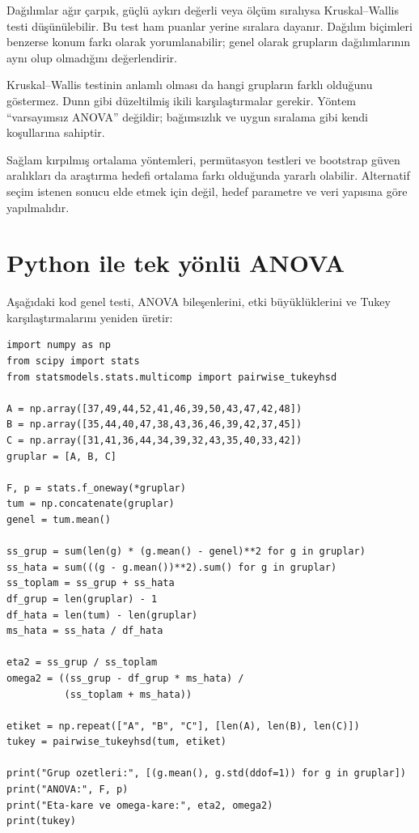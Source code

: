 Dağılımlar ağır çarpık, güçlü aykırı değerli veya ölçüm sıralıysa
Kruskal--Wallis testi düşünülebilir. Bu test ham puanlar yerine sıralara
dayanır. Dağılım biçimleri benzerse konum farkı olarak yorumlanabilir; genel
olarak grupların dağılımlarının aynı olup olmadığını değerlendirir.

Kruskal--Wallis testinin anlamlı olması da hangi grupların farklı olduğunu
göstermez. Dunn gibi düzeltilmiş ikili karşılaştırmalar gerekir. Yöntem
``varsayımsız ANOVA'' değildir; bağımsızlık ve uygun sıralama gibi kendi
koşullarına sahiptir.

Sağlam kırpılmış ortalama yöntemleri, permütasyon testleri ve bootstrap güven
aralıkları da araştırma hedefi ortalama farkı olduğunda yararlı olabilir.
Alternatif seçim istenen sonucu elde etmek için değil, hedef parametre ve veri
yapısına göre yapılmalıdır.

\section{Python ile tek yönlü ANOVA}

Aşağıdaki kod genel testi, ANOVA bileşenlerini, etki büyüklüklerini ve Tukey
karşılaştırmalarını yeniden üretir:

\begin{lstlisting}
import numpy as np
from scipy import stats
from statsmodels.stats.multicomp import pairwise_tukeyhsd

A = np.array([37,49,44,52,41,46,39,50,43,47,42,48])
B = np.array([35,44,40,47,38,43,36,46,39,42,37,45])
C = np.array([31,41,36,44,34,39,32,43,35,40,33,42])
gruplar = [A, B, C]

F, p = stats.f_oneway(*gruplar)
tum = np.concatenate(gruplar)
genel = tum.mean()

ss_grup = sum(len(g) * (g.mean() - genel)**2 for g in gruplar)
ss_hata = sum(((g - g.mean())**2).sum() for g in gruplar)
ss_toplam = ss_grup + ss_hata
df_grup = len(gruplar) - 1
df_hata = len(tum) - len(gruplar)
ms_hata = ss_hata / df_hata

eta2 = ss_grup / ss_toplam
omega2 = ((ss_grup - df_grup * ms_hata) /
          (ss_toplam + ms_hata))

etiket = np.repeat(["A", "B", "C"], [len(A), len(B), len(C)])
tukey = pairwise_tukeyhsd(tum, etiket)

print("Grup ozetleri:", [(g.mean(), g.std(ddof=1)) for g in gruplar])
print("ANOVA:", F, p)
print("Eta-kare ve omega-kare:", eta2, omega2)
print(tukey)
\end{lstlisting}

